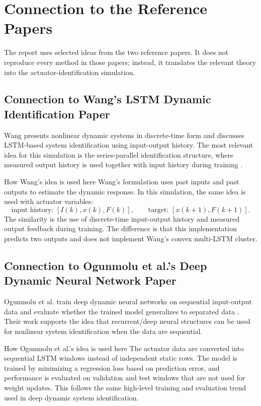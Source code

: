\documentclass[11pt]{article}
\begin{document}
\section{Connection to the Reference Papers}
The report uses selected ideas from the two reference papers. It does not reproduce every method in those papers; instead, it translates the relevant theory into the actuator-identification simulation.

\subsection{Connection to Wang's LSTM Dynamic Identification Paper}
Wang presents nonlinear dynamic systems in discrete-time form and discusses LSTM-based system identification using input-output history. The most relevant idea for this simulation is the series-parallel identification structure, where measured output history is used together with input history during training \cite{wang2017}.

\begin{paperbox}{How Wang's idea is used here}
Wang's formulation uses past inputs and past outputs to estimate the dynamic response. In this simulation, the same idea is used with actuator variables:
\begin{equation}
\text{input history: }[I(k),x(k),F(k)], \qquad
\text{target: }[x(k+1),F(k+1)].
\end{equation}
The similarity is the use of discrete-time input-output history and measured output feedback during training. The difference is that this implementation predicts two outputs and does not implement Wang's convex multi-LSTM cluster.
\end{paperbox}

\subsection{Connection to Ogunmolu et al.'s Deep Dynamic Neural Network Paper}
Ogunmolu et al. train deep dynamic neural networks on sequential input-output data and evaluate whether the trained model generalizes to separated data \cite{ogunmolu2016}. Their work supports the idea that recurrent/deep neural structures can be used for nonlinear system identification when the data are sequential.

\begin{paperbox}{How Ogunmolu et al.'s idea is used here}
The actuator data are converted into sequential LSTM windows instead of independent static rows. The model is trained by minimizing a regression loss based on prediction error, and performance is evaluated on validation and test windows that are not used for weight updates. This follows the same high-level training and evaluation trend used in deep dynamic system identification.
\end{paperbox}
\end{document}
